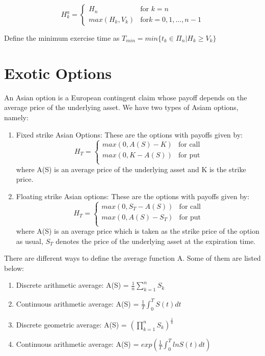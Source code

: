 \documentclass{report}
\begin{document}
\[
H_k^a = \begin{cases}
    H_n & \text{for }k = n\\
    max(H_k, V_k) & \text{for} k = 0, 1, \dots, n-1
\end{cases}\]


Define the minimum exercise time as 
$T_{min} = min\{t_k \in \Pi_n | H_k \geq V_k\}$


\section{Exotic Options}
An Asian option is a European contingent claim whose payoff depends on the average price of the underlying asset. We have two types of Asiam options, namely:
\begin{enumerate}
    \item Fixed strike Asian Options: These are the options with payoffs given by:
    \[H_T = \begin{cases}
        max(0, A(S)-K) & \text{for call}\\
        max(0, K-A(S)) & \text{for put}\\
    \end{cases}\]
    where A(S) is an average price of the underlying asset and K is the strike price.
    \item Floating strike Asian options: These are the options with payoffs given by:
    \[H_T = \begin{cases}
        max(0, S_T - A(S)) & \text{for call}\\
        max(0, A(S) - S_T) & \text{for put}\\
    \end{cases}\]
    where A(S) is an average price which is taken as the strike price of the option as usual, $S_T$ denotes the price of the underlying asset at the expiration time.
\end{enumerate}


There are different ways to define the average function A. Some of them are listed below:
\begin{enumerate}
    \item Discrete arithmetic average: A(S) = $\frac{1}{n}\sum_{k=1}^nS_k$
    \item Continuous arithmetic average: A(S) = $\frac{1}{T}\int_{0}^TS(t)dt$
    \item Discrete geometric average: A(S) = $(\prod_{k=1}^nS_k)^{\frac{1}{n}}$
    \item Continuous arithmetic average: A(S) = $exp(\frac{1}{T}\int_{0}^TlnS(t)dt)$
\end{enumerate}
\end{document}
